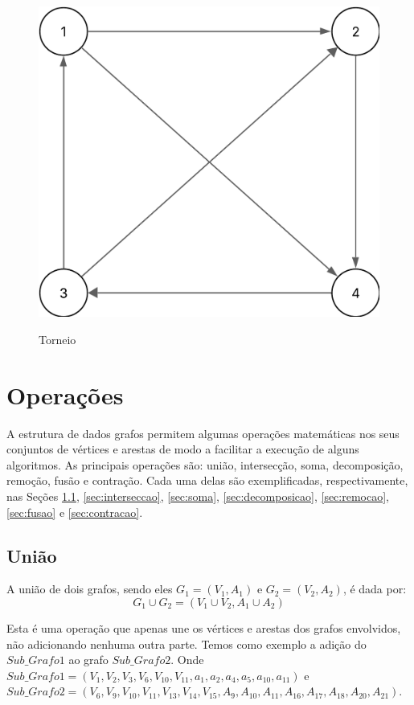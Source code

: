 	\begin{figure} [H]
		\centering
		\caption{Torneio}%
		\label{fig:torneio}%
		\includegraphics[width=0.5\linewidth,angle=0]{figuras/tiposgrafos/torneio.png}%
		\\
	\end{figure}
	
	
	\chapter{Operações}\label{cap:operacoes}
	
	A estrutura de dados grafos permitem algumas operações matemáticas nos seus conjuntos de vértices e arestas de modo a facilitar a execução de alguns algoritmos. As principais operações são: união, intersecção, soma, decomposição, remoção, fusão e contração. Cada uma delas são exemplificadas, respectivamente, nas Seções \ref{sec:uniao}, \ref{sec:interseccao}, \ref{sec:soma}, \ref{sec:decomposicao}, \ref{sec:remocao}, \ref{sec:fusao} e \ref{sec:contracao}.
	
	\section{União}\label{sec:uniao}
	A união de dois grafos, sendo eles $G_1 = (V_1, A_1)$ e $G_2 = (V_2, A_2)$, é dada por:
	\[
	G_1 \cup G_2 = (V_1 \cup V_2, A_1 \cup A_2)
	\]
	
	Esta é uma operação que apenas une os vértices e arestas dos grafos envolvidos, não adicionando nenhuma outra parte.
	Temos como exemplo a adição do $Sub\_Grafo1$ ao grafo $Sub\_Grafo2$.
	Onde $Sub\_Grafo1 = (V_1, V_2, V_3, V_6, V_{10}, V_{11}, a_1, a_2, a_4, a_5, a_{10}, a_{11} )$ e $Sub\_Grafo2 = (V_6, V_9, V_{10}, V_{11}, V_{13}, V_{14}, V_{15}, A_{9}, A_{10}, A_{11}, A_{16}, A_{17}, A_{18}, A_{20}, A_{21})$.
	
